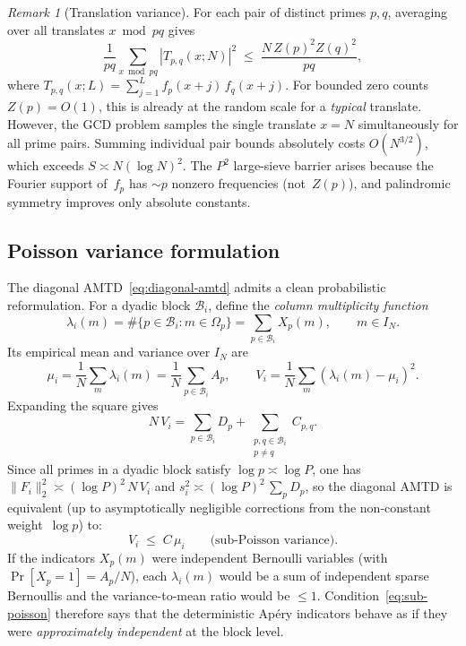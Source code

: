 \documentclass[11pt]{article}
\theoremstyle{definition}
\theoremstyle{remark}
\newtheorem{remark}[theorem]{Remark}
\begin{document}
\begin{remark}[Translation variance]
\label{rem:translate}
For each pair of distinct primes $p, q$,
averaging over all translates $x \bmod pq$
gives
\[
  \frac{1}{pq} \sum_{x \bmod pq}
  |T_{p,q}(x; N)|^2
  \;\le\;
  \frac{N\,Z(p)^2 Z(q)^2}{pq},
\]
where $T_{p,q}(x; L) = \sum_{j=1}^L f_p(x+j)\,f_q(x+j)$.
For bounded zero counts $Z(p) = O(1)$,
this is already at the random scale for a
\emph{typical} translate.
However, the GCD problem samples the single
translate $x = N$ simultaneously for all prime
pairs.
Summing individual pair bounds absolutely
costs $O(N^{3/2})$, which exceeds $S \asymp N(\log N)^2$.
The $P^2$ large-sieve barrier arises because
the Fourier support of~$f_p$ has $\sim p$
nonzero frequencies (not~$Z(p)$), and
palindromic symmetry improves only absolute constants.
\end{remark}











\subsection{Poisson variance formulation}\label{ssec:poisson}

The diagonal AMTD~\eqref{eq:diagonal-amtd} admits a
clean probabilistic reformulation.
For a dyadic block $\mathcal{B}_i$, define
the \emph{column multiplicity function}
\[
  \lambda_i(m)
  = \#\{p \in \mathcal{B}_i : m \in \Omega_p\}
  = \sum_{p \in \mathcal{B}_i} X_p(m),
  \qquad m \in I_N.
\]
Its empirical mean and variance over $I_N$ are
\[
  \mu_i = \frac{1}{N}\sum_{m} \lambda_i(m)
  = \frac{1}{N}\sum_{p \in \mathcal{B}_i} A_p,
  \qquad
  V_i = \frac{1}{N}\sum_m (\lambda_i(m) - \mu_i)^2.
\]
Expanding the square gives
\[
  N\,V_i
  = \sum_{p \in \mathcal{B}_i} D_p
  + \sum_{\substack{p,q \in \mathcal{B}_i \\ p \neq q}}
  C_{p,q}.
\]
Since all primes in a dyadic block satisfy
$\log p \asymp \log P$, one has
$\|F_i\|_2^2 \asymp (\log P)^2\,N\,V_i$
and $s_i^2 \asymp (\log P)^2\,\sum_p D_p$,
so the diagonal AMTD is equivalent (up to
asymptotically negligible corrections from
the non-constant weight~$\log p$) to:
\begin{equation}\label{eq:sub-poisson}
  V_i \;\le\; C\,\mu_i
  \qquad\text{(sub-Poisson variance)}.
\end{equation}
If the indicators $X_p(m)$ were independent
Bernoulli variables (with $\Pr[X_p = 1] = A_p/N$),
each $\lambda_i(m)$ would be a sum of independent
sparse Bernoullis and the variance-to-mean ratio
would be $\le 1$.
Condition~\eqref{eq:sub-poisson} therefore says
that the deterministic Ap\'ery indicators behave
as if they were \emph{approximately independent}
at the block level.
\end{document}
